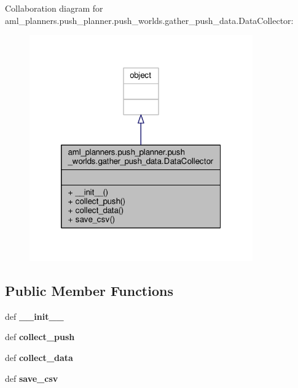 Collaboration diagram for aml\-\_\-planners.\-push\-\_\-planner.\-push\-\_\-worlds.\-gather\-\_\-push\-\_\-data.\-Data\-Collector\-:\nopagebreak
\begin{figure}[H]
\begin{center}
\leavevmode
\includegraphics[width=272pt]{classaml__planners_1_1push__planner_1_1push__worlds_1_1gather__push__data_1_1_data_collector__coll__graph}
\end{center}
\end{figure}
\subsection*{Public Member Functions}
\begin{DoxyCompactItemize}
\item 
\hypertarget{classaml__planners_1_1push__planner_1_1push__worlds_1_1gather__push__data_1_1_data_collector_a32ef2ebdca2e563bb0c2b01b46ab5df5}{def {\bfseries \-\_\-\-\_\-init\-\_\-\-\_\-}}\label{classaml__planners_1_1push__planner_1_1push__worlds_1_1gather__push__data_1_1_data_collector_a32ef2ebdca2e563bb0c2b01b46ab5df5}

\item 
\hypertarget{classaml__planners_1_1push__planner_1_1push__worlds_1_1gather__push__data_1_1_data_collector_a62331959ee0eb3b139215da97f4570f3}{def {\bfseries collect\-\_\-push}}\label{classaml__planners_1_1push__planner_1_1push__worlds_1_1gather__push__data_1_1_data_collector_a62331959ee0eb3b139215da97f4570f3}

\item 
\hypertarget{classaml__planners_1_1push__planner_1_1push__worlds_1_1gather__push__data_1_1_data_collector_aa9f92109a8bbe03c4cc523e21ca68b3a}{def {\bfseries collect\-\_\-data}}\label{classaml__planners_1_1push__planner_1_1push__worlds_1_1gather__push__data_1_1_data_collector_aa9f92109a8bbe03c4cc523e21ca68b3a}

\item 
\hypertarget{classaml__planners_1_1push__planner_1_1push__worlds_1_1gather__push__data_1_1_data_collector_a12621eaffd3bcc8de97401db941c62df}{def {\bfseries save\-\_\-csv}}\label{classaml__planners_1_1push__planner_1_1push__worlds_1_1gather__push__data_1_1_data_collector_a12621eaffd3bcc8de97401db941c62df}

\end{DoxyCompactItemize}



